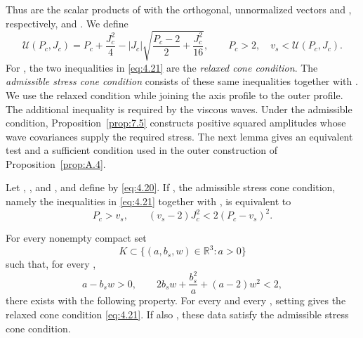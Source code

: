 %
Thus  are the scalar products of  with the orthogonal, unnormalized vectors  and , respectively, and . We define
\begin{equation}
  \mathcal{U}(P_c,J_c)=P_c+\frac{J_c^2}{4}-|J_c|\sqrt{\frac{P_c-2}{2}+\frac{J_c^2}{16}},
  \qquad P_c>2,\quad v_s<\mathcal{U}(P_c,J_c).
  \tag{4.21}\label{eq:4.21}
\end{equation}
For , the two inequalities in \eqref{eq:4.21} are the \emph{relaxed cone condition}. The \emph{admissible stress cone condition} consists of these same inequalities together with . We use the relaxed condition while joining the axis profile to the outer profile. The additional inequality is required by the viscous waves. Under the admissible condition, Proposition~\ref{prop:7.5} constructs positive squared amplitudes whose wave covariances supply the required stress. The next lemma gives an equivalent test and a sufficient condition used in the outer construction of Proposition~\ref{prop:A.4}.

\begin{lemma}\label{lem:4.5}
Let , , and , and define  by \eqref{eq:4.20}. If , the admissible stress cone condition, namely the inequalities in \eqref{eq:4.21} together with , is equivalent to
\begin{equation}
  P_c>v_s,\qquad (v_s-2)J_c^2<2(P_c-v_s)^2.
  \tag{4.22}\label{eq:4.22}
\end{equation}

For every nonempty compact set
\[
  K\subset\{(a,b_s,w)\in\mathbb{R}^3:a>0\}
\]
such that, for every ,
\[
  a-b_sw>0,\qquad 2b_sw+\frac{b_s^2}{a}+(a-2)w^2<2,
\]
there exists  with the following property. For every  and every , setting  gives the relaxed cone condition \eqref{eq:4.21}. If also , these data satisfy the admissible stress cone condition.
\end{lemma}

